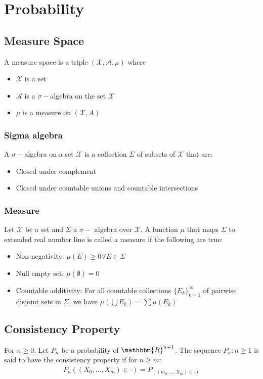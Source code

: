 \chapter{Probability} 

\section{Measure Space}
A measure space is a triple $(\mathcal{X, A, \mu})$ where
    \begin{itemize}
        \item $\mathcal{X}$ is a set
        \item $\mathcal{A}$ is a $\sigma-$algebra on the set $\mathcal{X}$
        \item $\mu$ is a measure on $(\mathcal{X}, A)$
    \end{itemize}
    

\subsection{Sigma algebra}
A $\sigma-$algebra on a set $\mathcal{X}$ is a collection $\Sigma$ of subsets of $\mathcal{X}$ that are: 
    \begin{itemize}
        \item Closed under complement 
        \item Closed under countable unions and countable intersections
    \end{itemize}

\subsection{Measure}
Let $\mathcal{X}$ be a set and $\Sigma$ a $\sigma-$ algebra over $\mathcal{X}$. A function $\mathcal{\mu}$ that maps $\Sigma$ to extended real number line is called a measure if the following are true: 
    \begin{itemize}
        \item Non-negativity: $\mathcal{\mu}(E) \geq 0 \forall E \in \mathcal{\Sigma}$
        \item Null empty set: $\mathcal{\mu}(\emptyset) = 0$
        \item Countable additivity: For all countable collections $\{E_k\}_{k=1}^\infty$ of pairwise disjoint sets in $\Sigma$, we have $\mathcal{\mu}(\bigcup E_k) = \sum \mathcal{\mu}(E_k)$
    \end{itemize}


\section{Consistency Property} 
For $n \geq 0$. Let $P_n$ be a probability of $\mathbbm{R}^{n+1}$. The sequence $P_n: n \geq 1$ is said to have the consistency property if for $n \geq m$: 
    \begin{align*}
        P_n((X_0, ..., X_m) \in \cdot) = P_((m_0, ..., X_m) \in \cdot)
    \end{align*}

